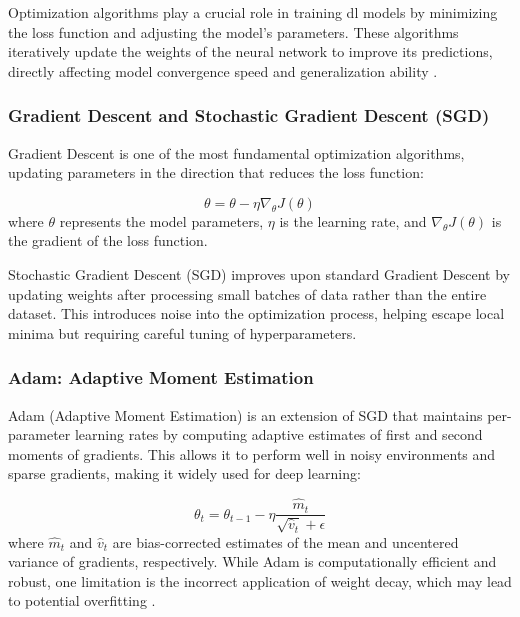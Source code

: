Optimization algorithms play a crucial role in training \gls{dl} models by 
minimizing the loss function and adjusting the model's parameters. These algorithms 
iteratively update the weights of the neural network to improve its predictions, 
directly affecting model convergence speed and generalization ability \cite{ruder2016overview}. 

\subsubsection{Gradient Descent and Stochastic Gradient Descent (SGD)}

Gradient Descent is one of the most fundamental optimization algorithms, updating 
parameters in the direction that reduces the loss function:

\begin{equation}
    \theta = \theta - \eta \nabla_\theta J(\theta)
\end{equation}
where \( \theta \) represents the model parameters, \( \eta \) is the learning rate, 
and \( \nabla_\theta J(\theta) \) is the gradient of the loss function.  

Stochastic Gradient Descent (SGD) improves upon standard Gradient Descent by 
updating weights after processing small batches of data rather than the entire dataset.  
This introduces noise into the optimization process, helping escape local minima 
but requiring careful tuning of hyperparameters.

\subsubsection{Adam: Adaptive Moment Estimation}

Adam (Adaptive Moment Estimation) \cite{kingma2015adam} is an extension of SGD that 
maintains per-parameter learning rates by computing adaptive estimates of first and 
second moments of gradients. This allows it to perform well in noisy environments 
and sparse gradients, making it widely used for deep learning:

\begin{equation}
    \theta_t = \theta_{t-1} - \eta \frac{\hat{m}_t}{\sqrt{\hat{v}_t} + \epsilon}
\end{equation}
where \( \hat{m}_t \) and \( \hat{v}_t \) are bias-corrected estimates of the mean 
and uncentered variance of gradients, respectively. While Adam is computationally 
efficient and robust, one limitation is the incorrect application of weight decay, 
which may lead to potential overfitting \cite{loshchilov2019decoupled}.

